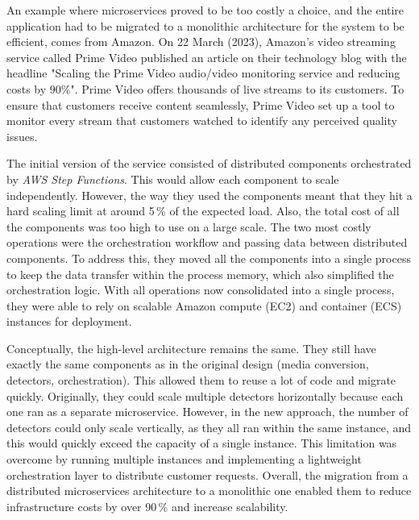 \begin{example}
    An example where microservices proved to be too costly a choice, and the entire application had to be migrated to a monolithic architecture for the system to be efficient, comes from Amazon. On 22 March (2023), Amazon's video streaming service called Prime Video published an article on their technology blog with the headline "Scaling the Prime Video audio/video monitoring service and reducing costs by 90\%". Prime Video offers thousands of live streams to its customers. To ensure that customers receive content seamlessly, Prime Video set up a tool to monitor every stream that customers watched to identify any perceived quality issues. \cite{AMAZON_ARTICLE}

    The initial version of the service consisted of distributed components orchestrated by \textit{AWS Step Functions}. This would allow each component to scale independently. However, the way they used the components meant that they hit a hard scaling limit at around 5\,\% of the expected load. Also, the total cost of all the components was too high to use on a large scale. The two most costly operations were the orchestration workflow and passing data between distributed components. To address this, they moved all the components into a single process to keep the data transfer within the process memory, which also simplified the orchestration logic. With all operations now consolidated into a single process, they were able to rely on scalable Amazon compute (EC2) and container (ECS) instances for deployment. \cite{AMAZON_ARTICLE}

    Conceptually, the high-level architecture remains the same. They still have exactly the same components as in the original design (media conversion, detectors, orchestration). This allowed them to reuse a lot of code and migrate quickly. Originally, they could scale multiple detectors horizontally because each one ran as a separate microservice. However, in the new approach, the number of detectors could only scale vertically, as they all ran within the same instance, and this would quickly exceed the capacity of a single instance. This limitation was overcome by running multiple instances and implementing a lightweight orchestration layer to distribute customer requests. Overall, the migration from a distributed microservices architecture to a monolithic one enabled them to reduce infrastructure costs by over 90\,\% and increase scalability. \cite{AMAZON_ARTICLE}
\end{example}

